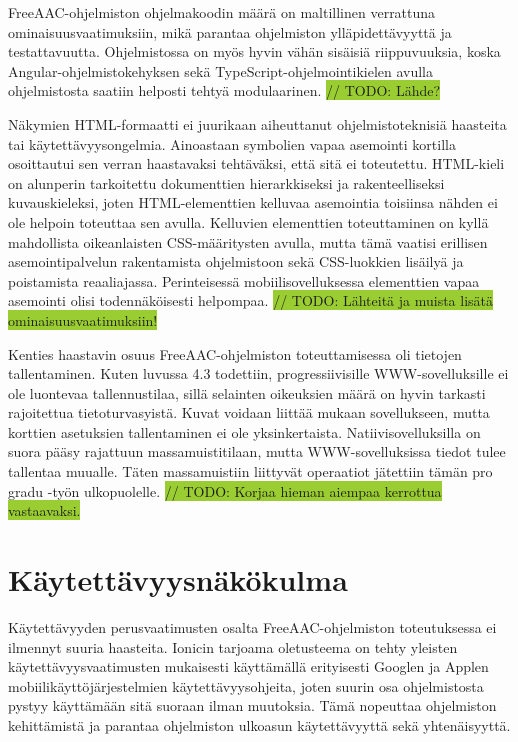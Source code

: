 \documentclass[utf8]{gradu3}
\begin{document}
FreeAAC-ohjelmiston ohjelmakoodin määrä on maltillinen verrattuna ominaisuusvaatimuksiin, mikä parantaa ohjelmiston ylläpidettävyyttä ja testattavuutta. Ohjelmistossa on myös hyvin vähän sisäisiä riippuvuuksia, koska Angular-ohjelmistokehyksen sekä TypeScript-ohjelmointikielen avulla ohjelmistosta saatiin helposti tehtyä modulaarinen.
\colorbox{YellowGreen}{// TODO: Lähde?}

Näkymien HTML-formaatti ei juurikaan aiheuttanut ohjelmistoteknisiä haasteita tai käytettävyysongelmia. Ainoastaan symbolien vapaa asemointi kortilla osoittautui sen verran haastavaksi tehtäväksi, että sitä ei toteutettu. HTML-kieli on alunperin tarkoitettu dokumenttien hierarkkiseksi ja rakenteelliseksi kuvauskieleksi, joten HTML-elementtien kelluvaa asemointia toisiinsa nähden ei ole helpoin toteuttaa sen avulla. Kelluvien elementtien toteuttaminen on kyllä mahdollista oikeanlaisten CSS-määritysten avulla, mutta tämä vaatisi erillisen asemointipalvelun rakentamista ohjelmistoon sekä CSS-luokkien lisäilyä ja poistamista reaaliajassa. Perinteisessä mobiilisovelluksessa elementtien vapaa asemointi olisi todennäköisesti helpompaa.
\colorbox{YellowGreen}{// TODO: Lähteitä ja muista lisätä ominaisuusvaatimuksiin!}

Kenties haastavin osuus FreeAAC-ohjelmiston toteuttamisessa oli tietojen tallentaminen. Kuten luvussa 4.3 todettiin, progressiivisille WWW-sovelluksille ei ole luontevaa tallennustilaa, sillä selainten oikeuksien määrä on hyvin tarkasti rajoitettua tietoturvasyistä. Kuvat voidaan liittää mukaan sovellukseen, mutta korttien asetuksien tallentaminen ei ole yksinkertaista. Natiivisovelluksilla on suora pääsy rajattuun massamuistitilaan, mutta WWW-sovelluksissa tiedot tulee tallentaa muualle. Täten massamuistiin liittyvät operaatiot jätettiin tämän pro gradu -työn ulkopuolelle.
\colorbox{YellowGreen}{// TODO: Korjaa hieman aiempaa kerrottua vastaavaksi.}

\section{Käytettävyysnäkökulma}

Käytettävyyden perusvaatimusten osalta FreeAAC-ohjelmiston toteutuksessa ei ilmennyt suuria haasteita. Ionicin tarjoama oletusteema on tehty yleisten käytettävyysvaatimusten mukaisesti käyttämällä erityisesti Googlen ja Applen mobiilikäyttöjärjestelmien käytettävyysohjeita, joten suurin osa ohjelmistosta pystyy käyttämään sitä suoraan ilman muutoksia. Tämä nopeuttaa ohjelmiston kehittämistä ja parantaa ohjelmiston ulkoasun käytettävyyttä sekä yhtenäisyyttä.
\end{document}

